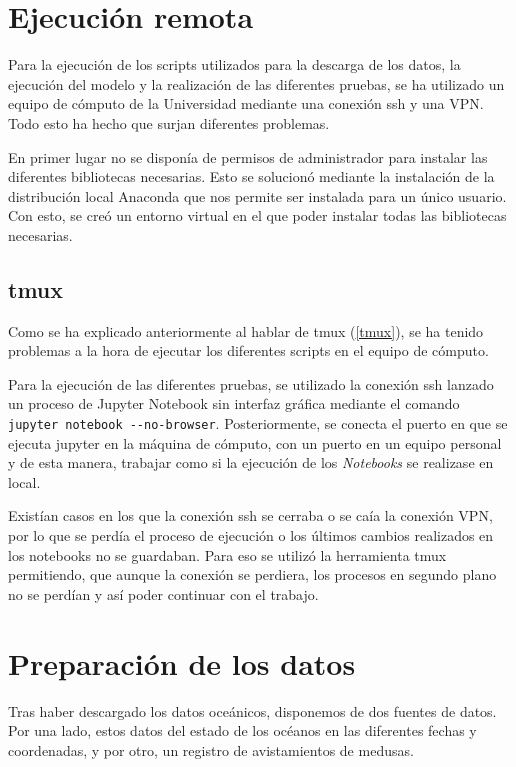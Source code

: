 \section{Ejecución remota}
Para la ejecución de los scripts utilizados para la descarga de los datos, la ejecución del modelo y la realización de las diferentes pruebas, se ha utilizado un equipo de cómputo de la Universidad mediante una conexión ssh y una VPN. Todo esto ha hecho que surjan diferentes problemas.

En primer lugar no se disponía de permisos de administrador para instalar las diferentes bibliotecas necesarias. Esto se solucionó mediante la instalación de la distribución local Anaconda que nos permite ser instalada para un único usuario. Con esto, se creó un entorno virtual en el que poder instalar todas las bibliotecas necesarias.

\subsection{tmux}
Como se ha explicado anteriormente al hablar de tmux (\ref{tmux}), se ha tenido problemas a la hora de ejecutar los diferentes scripts en el equipo de cómputo.

Para la ejecución de las diferentes pruebas, se utilizado la conexión ssh lanzado un proceso de Jupyter Notebook sin interfaz gráfica mediante el comando \verb|jupyter notebook --no-browser|. Posteriormente, se conecta el puerto en que se ejecuta jupyter en la máquina de cómputo, con un puerto en un equipo personal y de esta manera, trabajar como si la ejecución de los \emph{Notebooks} se realizase en local.


Existían casos en los que la conexión ssh se cerraba o se caía la conexión VPN, por lo que se perdía el proceso de ejecución o los últimos cambios realizados en los notebooks no se guardaban. Para eso se utilizó la herramienta tmux permitiendo, que aunque la conexión se perdiera, los procesos en segundo plano no se perdían y así poder continuar con el trabajo.

\section{Preparación de los datos}
Tras haber descargado los datos oceánicos, disponemos de dos fuentes de datos. Por una lado, estos datos del estado de los océanos en las diferentes fechas y coordenadas, y por otro, un registro de avistamientos de medusas.

